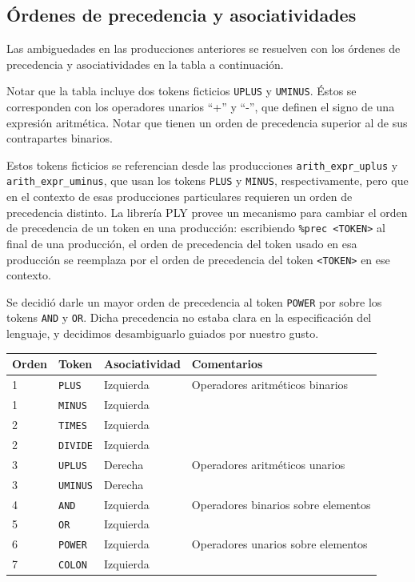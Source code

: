 \documentclass[a4paper, 10pt, twoside]{article}
\begin{document}
\subsection{Órdenes de precedencia y asociatividades}

Las ambiguedades en las producciones anteriores se resuelven con los órdenes de precedencia y asociatividades en la tabla a continuación.

Notar que la tabla incluye dos tokens ficticios \texttt{UPLUS} y \texttt{UMINUS}. Éstos se corresponden con los operadores unarios ``+'' y ``-'', que definen el signo de una expresión aritmética. Notar que tienen un orden de precedencia superior al de sus contrapartes binarios.

Estos tokens ficticios se referencian desde las producciones \texttt{arith\_expr\_uplus} y \texttt{arith\_expr\_uminus}, que usan los tokens \texttt{PLUS} y \texttt{MINUS}, respectivamente, pero que en el contexto de esas producciones particulares requieren un orden de precedencia distinto. La librería PLY provee un mecanismo para cambiar el orden de precedencia de un token en una producción: escribiendo \texttt{\%prec \textless{}TOKEN\textgreater} al final de una producción, el orden de precedencia del token usado en esa producción se reemplaza por el orden de precedencia del token \texttt{\textless{}TOKEN\textgreater} en ese contexto.

Se decidió darle un mayor orden de precedencia al token \texttt{POWER} por sobre los tokens \texttt{AND} y \texttt{OR}. Dicha precedencia no estaba clara en la especificación del lenguaje, y decidimos desambiguarlo guiados por nuestro gusto.


\vspace{1em}
\begin{tabular}{llll}
  \hline
  Orden & Token           & Asociatividad & Comentarios\\
  \hline\hline
  1     & \texttt{PLUS}   & Izquierda     & Operadores aritméticos binarios\\
  1     & \texttt{MINUS}  & Izquierda     &\\
  2     & \texttt{TIMES}  & Izquierda     &\\
  2     & \texttt{DIVIDE} & Izquierda     &\\
  \hline
  3     & \texttt{UPLUS}  & Derecha       & Operadores aritméticos unarios\\
  3     & \texttt{UMINUS} & Derecha       &\\
  \hline
  4     & \texttt{AND}    & Izquierda     & Operadores binarios sobre elementos\\
  5     & \texttt{OR}     & Izquierda     &\\
  \hline
  6     & \texttt{POWER}  & Izquierda     & Operadores unarios sobre elementos\\
  7     & \texttt{COLON}  & Izquierda     &\\
  \hline
\end{tabular}
\end{document}
